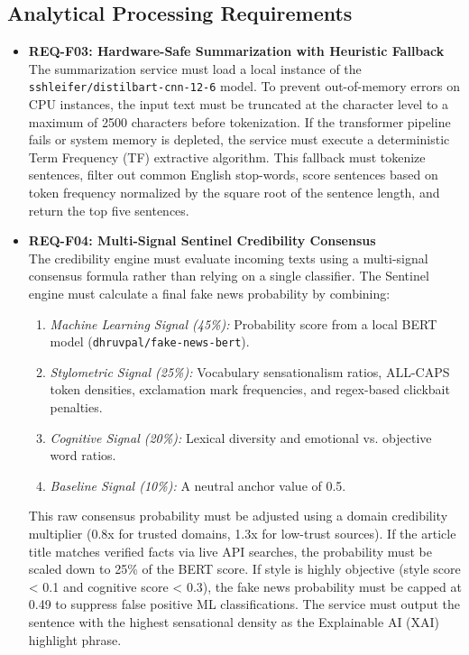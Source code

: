 \subsection{Analytical Processing Requirements}
\begin{itemize}
    \item \textbf{REQ-F03: Hardware-Safe Summarization with Heuristic Fallback} \\
    The summarization service must load a local instance of the \texttt{sshleifer/\allowbreak{}distilbart-\allowbreak{}cnn-\allowbreak{}12-6} model. To prevent out-of-memory errors on CPU instances, the input text must be truncated at the character level to a maximum of 2500 characters before tokenization. If the transformer pipeline fails or system memory is depleted, the service must execute a deterministic Term Frequency (TF) extractive algorithm. This fallback must tokenize sentences, filter out common English stop-words, score sentences based on token frequency normalized by the square root of the sentence length, and return the top five sentences.
    \item \textbf{REQ-F04: Multi-Signal Sentinel Credibility Consensus} \\
    The credibility engine must evaluate incoming texts using a multi-signal consensus formula rather than relying on a single classifier. The Sentinel engine must calculate a final fake news probability by combining:
    \begin{enumerate}
        \item \textit{Machine Learning Signal (45\%):} Probability score from a local BERT model (\texttt{dhruvpal/\allowbreak{}fake-\allowbreak{}news-\allowbreak{}bert}).
        \item \textit{Stylometric Signal (25\%):} Vocabulary sensationalism ratios, ALL-CAPS token densities, exclamation mark frequencies, and regex-based clickbait penalties.
        \item \textit{Cognitive Signal (20\%):} Lexical diversity and emotional vs. objective word ratios.
        \item \textit{Baseline Signal (10\%):} A neutral anchor value of 0.5.
    \end{enumerate}
    This raw consensus probability must be adjusted using a domain credibility multiplier (0.8x for trusted domains, 1.3x for low-trust sources). If the article title matches verified facts via live API searches, the probability must be scaled down to 25\% of the BERT score. If style is highly objective (style score < 0.1 and cognitive score < 0.3), the fake news probability must be capped at 0.49 to suppress false positive ML classifications. The service must output the sentence with the highest sensational density as the Explainable AI (XAI) highlight phrase.

\end{itemize}
